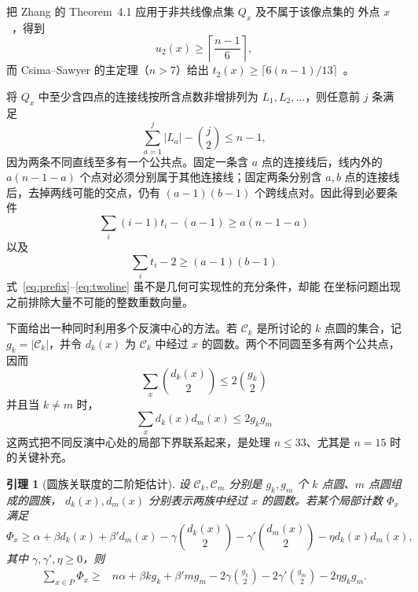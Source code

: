 \documentclass[11pt,a4paper]{ctexart}
\newtheorem{lemma}[theorem]{引理}
\theoremstyle{definition}
\begin{document}
把 Zhang 的 Theorem~4.1 应用于非共线像点集 $Q_x$ 及不属于该像点集的
外点 $x$~\cite[Theorem~4.1]{zhang}，得到
\begin{equation}\label{eq:zhang}
u_2(x)\ge\left\lceil\frac{n-1}{6}\right\rceil,
\end{equation}
而 Csima--Sawyer 的主定理（$n>7$）给出
$t_2(x)\ge\lceil6(n-1)/13\rceil$~\cite[Theorem on pp.~187--188]{csima-sawyer}。

将 $Q_x$ 中至少含四点的连接线按所含点数非增排列为
$L_1,L_2,\ldots$，则任意前 $j$ 条满足
\begin{equation}\label{eq:prefix}
\sum_{a=1}^j|L_a|-\binom j2\le n-1,
\end{equation}
因为两条不同直线至多有一个公共点。固定一条含 $a$ 点的连接线后，线内外的
$a(n-1-a)$ 个点对必须分别属于其他连接线；固定两条分别含 $a,b$ 点的连接线
后，去掉两线可能的交点，仍有 $(a-1)(b-1)$ 个跨线点对。因此得到必要条件
\begin{equation}\label{eq:oneline}
\sum_i(i-1)t_i-(a-1)\ge a(n-1-a)
\end{equation}
以及
\begin{equation}\label{eq:twoline}
\sum_it_i-2\ge(a-1)(b-1)
\end{equation}
式~\eqref{eq:prefix}--\eqref{eq:twoline} 虽不是几何可实现性的充分条件，却能
在坐标问题出现之前排除大量不可能的整数重数向量。

下面给出一种同时利用多个反演中心的方法。若 $\mathcal C_k$ 是所讨论的
$k$ 点圆的集合，记 $g_k=|\mathcal C_k|$，并令 $d_k(x)$ 为 $\mathcal C_k$
中经过 $x$ 的圆数。两个不同圆至多有两个公共点，因而
\begin{equation}\label{eq:samesupport}
\sum_x\binom{d_k(x)}2\le2\binom{g_k}{2}
\end{equation}
并且当 $k\ne m$ 时，
\begin{equation}\label{eq:crosssupport}
\sum_xd_k(x)d_m(x)\le2g_kg_m
\end{equation}
这两式把不同反演中心处的局部下界联系起来，是处理 $n\le33$、尤其是
$n=15$ 时的关键补充。

\begin{lemma}[圆族关联度的二阶矩估计]\label{lem:support-moment}
设 $\mathcal C_k,\mathcal C_m$ 分别是 $g_k,g_m$ 个 $k$ 点圆、$m$ 点圆组成的圆族，
$d_k(x),d_m(x)$ 分别表示两族中经过 $x$ 的圆数。若某个局部计数 $\Phi_x$ 满足
\[
\Phi_x\ge \alpha+\beta d_k(x)+\beta'd_m(x)
-\gamma\binom{d_k(x)}2-\gamma'\binom{d_m(x)}2
-\eta d_k(x)d_m(x),
\]
其中 $\gamma,\gamma',\eta\ge0$，则
\begin{align}
\sum_{x\in P}\Phi_x\ge{}&n\alpha+\beta k g_k+\beta'mg_m
-2\gamma\binom{g_k}{2}-2\gamma'\binom{g_m}{2}
-2\eta g_kg_m. \label{eq:support-moment}
\end{align}
\end{lemma}
\end{document}
